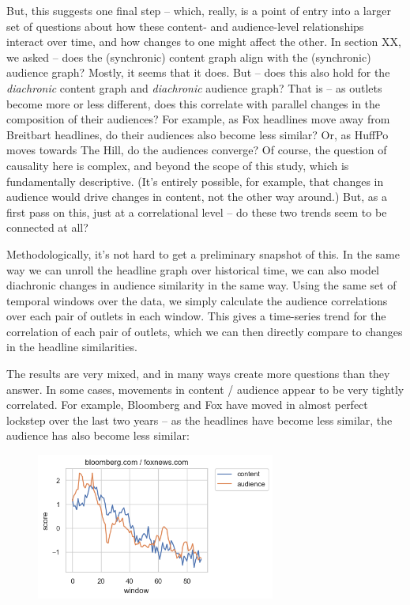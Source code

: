 \documentclass{scrartcl}
\begin{document}
But, this suggests one final step -- which, really, is a point of entry into a larger set of questions about how these content- and audience-level relationships interact over time, and how changes to one might affect the other. In section XX, we asked -- does the (synchronic) content graph align with the (synchronic) audience graph? Mostly, it seems that it does. But -- does this also hold for the \textit{diachronic} content graph and \textit{diachronic} audience graph? That is -- as outlets become more or less different, does this correlate with parallel changes in the composition of their audiences? For example, as Fox headlines move away from Breitbart headlines, do their audiences also become less similar? Or, as HuffPo moves towards The Hill, do the audiences converge? Of course, the question of causality here is complex, and beyond the scope of this study, which is fundamentally descriptive.  (It's entirely possible, for example, that changes in audience would drive changes in content, not the other way around.) But, as a first pass on this, just at a correlational level -- do these two trends seem to be connected at all?

Methodologically, it's not hard to get a preliminary snapshot of this. In the same way we can unroll the headline graph over historical time, we can also model diachronic changes in audience similarity in the same way. Using the same set of temporal windows over the data, we simply calculate the audience correlations over each pair of outlets in each window. This gives a time-series trend for the correlation of each pair of outlets, which we can then directly compare to changes in the headline similarities.

The results are very mixed, and in many ways create more questions than they answer. In some cases, movements in content / audience appear to be very tightly correlated. For example, Bloomberg and Fox have moved in almost perfect lockstep over the last two years -- as the headlines have become less similar, the audience has also become less similar:

\begin{figure}[H]
  \centering
  \includegraphics[width=0.7\textwidth]{figures/bloomberg-fox-corr.png}
\end{figure}
\end{document}
